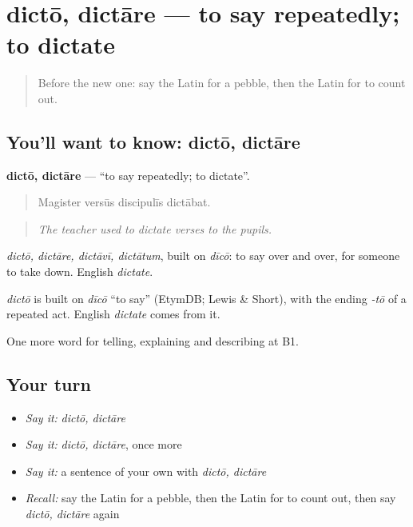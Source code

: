 \section[dictō, dictāre]{dictō, dictāre — to say repeatedly; to dictate}

\label{lesson:LA-C405-dicto}



\begin{quote}
Before the new one: say the Latin for a pebble, then the Latin for to count out.
\end{quote}

\subsection*{You'll want to know: dictō, dictāre}
\textbf{dictō, dictāre} — \textquotedblleft{}to say repeatedly; to dictate\textquotedblright{}.

\begin{quote}
Magister versūs discipulīs dictābat.
\end{quote}

\begin{quote}
\emph{The teacher used to dictate verses to the pupils.}
\end{quote}

\emph{dictō, dictāre, dictāvī, dictātum}, built on \emph{dīcō}: to say over and over, for someone to take down. English \emph{dictate}.

\begin{cousinweb}
\emph{dictō} is built on \emph{dīcō} \textquotedblleft{}to say\textquotedblright{} (EtymDB; Lewis \& Short), with the ending \emph{-tō} of a repeated act. English \emph{dictate} comes from it.
\end{cousinweb}

\begin{grammarlens}[title={What you've built}]
One more word for telling, explaining and describing at B1.
\end{grammarlens}

\subsection*{Your turn}
\begin{itemize}
\raggedright
  \item \emph{Say it:} \emph{dictō, dictāre}
  \item \emph{Say it:} \emph{dictō, dictāre}, once more
  \item \emph{Say it:} a sentence of your own with \emph{dictō, dictāre}
  \item \emph{Recall:} say the Latin for a pebble, then the Latin for to count out, then say \emph{dictō, dictāre} again
\end{itemize}

